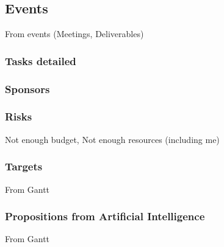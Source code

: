 \documentclass[8pt]{article} %
\begin{document}
\subsection{Events}
From events (Meetings, Deliverables)


%
%

%

\subsubsection{Tasks detailed}




\subsubsection{Sponsors}

\subsubsection{Risks}
Not enough budget, Not enough resources (including me)
\subsubsection{Targets}
From Gantt
\subsubsection{Propositions from Artificial Intelligence}
From Gantt
\end{document}

